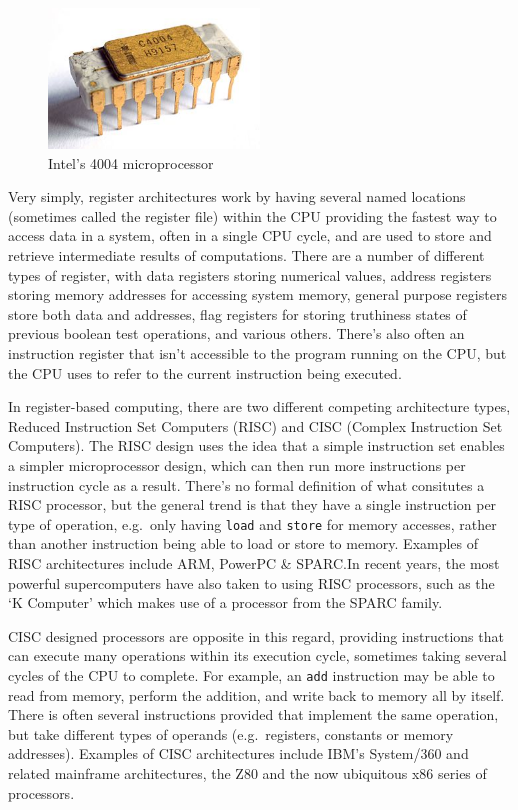 \begin{figure}
  \includegraphics[width=0.5\textwidth]{imgs/Intel_C4004}
  \caption{Intel's 4004 microprocessor}\label{fig:4004}
\end{figure}

Very simply, register architectures work by having several named locations
(sometimes called the register file) within the CPU providing the fastest way to
access data in a system, often in a single CPU cycle, and are used to store and
retrieve intermediate results of computations. There are a number of different
types of register, with data registers storing numerical values, address
registers storing memory addresses for accessing system memory, general purpose
registers store both data and addresses, flag registers for storing truthiness
states of previous boolean test operations, and various others. There's also
often an instruction register that isn't accessible to the program running on
the CPU, but the CPU uses to refer to the current instruction being executed.
\cite{Mittal2016RegisterFile}\cite{Patterson2011Computer}

In register-based computing, there are two different competing architecture
types, Reduced Instruction Set Computers (RISC) and CISC (Complex Instruction
Set Computers). The RISC design uses the idea that a simple instruction set
enables a simpler microprocessor design, which can then run more instructions
per instruction cycle as a result. There's no formal definition of what
consitutes a RISC processor, but the general trend is that they have a single
instruction per type of operation, e.g.\ only having \texttt{load} and
\texttt{store} for memory accesses, rather than another instruction being able
to load or store to memory. Examples of RISC architectures include ARM, PowerPC
\& SPARC.\@ In recent years, the most powerful supercomputers have also taken to
using RISC processors, such as the `K Computer' which makes use of a processor
from the SPARC family.\cite{Yokokawa2011KCJ}

CISC designed processors are opposite in this regard, providing instructions
that can execute many operations within its execution cycle, sometimes taking
several cycles of the CPU to complete. For example, an \texttt{add} instruction
may be able to read from memory, perform the addition, and write back to memory
all by itself. There is often several instructions provided that implement the
same operation, but take different types of operands (e.g.\ registers, constants
or memory addresses). Examples of CISC architectures include IBM's System/360
and related mainframe architectures, the Z80 and the now ubiquitous x86 series
of processors.\cite{Patterson1980CRI}

